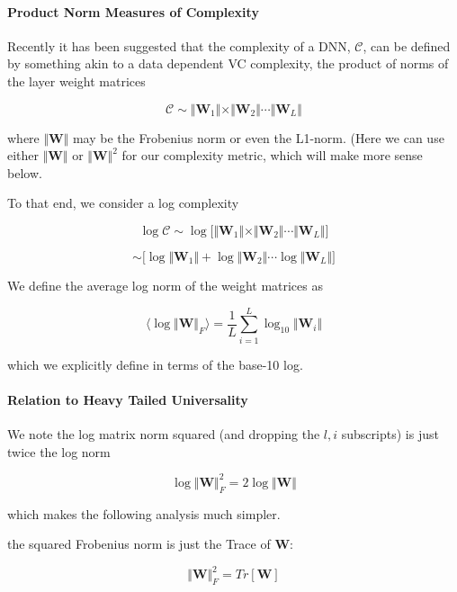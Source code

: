 
\paragraph{Product Norm Measures of Complexity}

Recently it has been suggested that the complexity of a DNN, $\mathcal{C}$,  can be defined by something akin to a data dependent VC complexity, the product of norms of the layer weight matrices

$$\mathcal{C}\sim\Vert\mathbf{W}_{1}\Vert\times\Vert\mathbf{W}_{2}\Vert\cdots\Vert\mathbf{W}_{L}\Vert$$

where $\Vert\mathbf{W}\Vert$ may be the Frobenius norm or even the L1-norm.  (Here we can use either  $\Vert\mathbf{W}\Vert$ or $\Vert\mathbf{W}\Vert^{2}$ for our complexity metric, which will make more sense below.


 To that end, we consider a log complexity

$$\log\mathcal{C}\sim\log\bigg[\Vert\mathbf{W}_{1}\Vert\times\Vert\mathbf{W}_{2}\Vert\cdots\Vert\mathbf{W}_{L}\Vert\bigg]$$

$$\sim\bigg[\log\Vert\mathbf{W}_{1}\Vert+\log\Vert\mathbf{W}_{2}\Vert\cdots\log\Vert\mathbf{W}_{L}\Vert\bigg]$$

We define the average log norm of the weight matrices as

$$\langle\log\Vert\mathbf{W}\Vert_{F}\rangle=\dfrac{1}{L}\sum_{i=1}^{L}\log_{10}\Vert\mathbf{W}_{i}\Vert$$

which we explicitly define in terms of the base-10 log.

\paragraph{Relation to Heavy Tailed Universality}

We note the  log matrix norm squared (and dropping the $l,i$ subscripts) is just twice the log norm

$$\log\Vert\mathbf{W}\Vert_{F}^{2}=2\log\Vert\mathbf{W}\Vert$$

which makes the following analysis much simpler.

the squared Frobenius norm is just the Trace of $\mathbf{W}$:

$$\Vert\mathbf{W}\Vert_{F}^{2}=Tr[\mathbf{W}]$$

